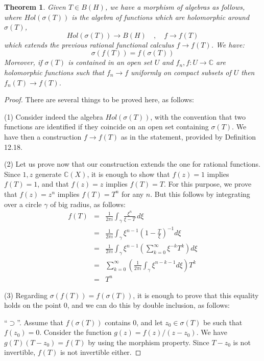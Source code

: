 \documentclass[12pt]{amsbook}
\newtheorem{theorem}{Theorem}[chapter]
\begin{document}

\begin{theorem}
Given $T\in B(H)$, we have a morphism of algebras as follows, where $Hol(\sigma(T))$ is the algebra of functions which are holomorphic around $\sigma(T)$,
$$Hol(\sigma(T))\to B(H)\quad,\quad f\to f(T)$$
which extends the previous rational functional calculus $f\to f(T)$. We have:
$$\sigma(f(T))=f(\sigma(T))$$
Moreover, if $\sigma(T)$ is contained in an open set $U$ and $f_n,f:U\to\mathbb C$ are holomorphic functions such that $f_n\to f$ uniformly on compact subsets of $U$ then $f_n(T)\to f(T)$.
\end{theorem}

\begin{proof}
There are several things to be proved here, as follows:

\medskip

(1) Consider indeed the algebra $Hol(\sigma(T))$, with the convention that two functions are identified if they coincide on an open set containing $\sigma(T)$. We have then a construction $f\to f(T)$ as in the statement, provided by Definition 12.18.

\medskip

(2) Let us prove now that our construction extends the one for rational functions. Since $1,z$ generate $\mathbb C(X)$, it is enough to show that $f(z)=1$ implies $f(T)=1$, and that $f(z)=z$ implies $f(T)=T$. For this purpose, we prove that $f(z)=z^n$ implies $f(T)=T^n$ for any $n$. But this follows by integrating over a circle $\gamma$ of big radius, as follows:
\begin{eqnarray*}
f(T)
&=&\frac{1}{2\pi i}\int_\gamma\frac{\xi^n}{\xi -T}\,d\xi\\
&=&\frac{1}{2\pi i}\int_\gamma \xi^{n-1}\left(1-\frac{T}{\xi}\right)^{-1}d\xi\\
&=&\frac{1}{2\pi i}\int_\gamma \xi^{n-1}\left(\sum_{k=0}^\infty \xi^{-k}T^k\right) d\xi\\
&=&\sum_{k=0}^\infty\left( \frac{1}{2\pi i}\int_\gamma\xi^{n-k-1}d\xi\right)T^k\\
&=&T^n
\end{eqnarray*}

(3) Regarding $\sigma(f(T))=f(\sigma(T))$, it is enough to prove that this equality holds on the point $0$, and we can do this by double inclusion, as follows:

\medskip

``$\supset$''. Assume that $f(\sigma(T))$ contains $0$, and let $z_0\in\sigma(T)$ be such that $f(z_0)=0$. Consider the function $g(z)=f(z)/(z-z_0)$.  We have $g(T)(T-z_0)=f(T)$ by using the morphism property. Since $T-z_0$ is not invertible, $f(T)$ is not invertible either.


\end{proof}
\end{document}
